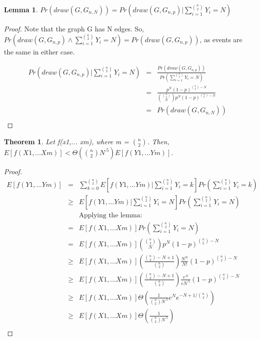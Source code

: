 \documentclass[10pt]{article}
\begin{document}
\newtheorem{lem}{Lemma}
\begin{lem}\label{Lemma}
$Pr(draw(G, G_{n,N})) = Pr(draw(G, G_{n,p})|\sum_{i=1}^{\binom{n}{2}}Y_{i}=N)$
\end{lem}

\begin{proof}

Note that the graph G has N edges. So, $Pr(draw(G, G_{n,p}) \wedge \sum_{i=1}^{\binom{n}{2}} Y_{i}=N) = Pr(draw(G, G_{n,p}))$, as events are the same in either case.

\begin{eqnarray}
Pr(draw(G, G_{n,p})|\sum_{i=1}^{\binom{n}{2}}Y_{i}=N) &=& \frac{Pr(draw(G, G_{n,p}))}{Pr(\sum_{i=1}^{\binom{n}{2}}Y_{i}=N)}\\
&=& \frac{p^{N} (1-p)^{\binom{n}{2}-N}}{\binom{\binom{n}{2}}{N} p^{N} (1-p)^{\binom{n}{2}-N}}\\
&=& Pr(draw(G, G_{n,N}))\\
\end{eqnarray} 
\end{proof}

\newtheorem{thm}{Theorem}
\begin{thm}\label{Theorem}
Let f(x1,... xm), where m = $\binom{n}{2}$. Then, $E[f(X1,... Xm)] < \Theta(\binom{n}{2}N^{.5}) E[f(Y1,... Ym)]$.
\end{thm}
\begin{proof}
\begin{eqnarray}
E[f(Y1,... Ym)] &=& \sum_{k=0}^{\binom{n}{2}}E[f(Y1,... Ym)|\sum_{i=1}^{\binom{n}{2}}Y_{i}=k]Pr(\sum_{i=1}^{\binom{n}{2}}Y_{i}=k) \\
&\geq& E[f(Y1,... Ym)|\sum_{i=1}^{\binom{n}{2}}Y_{i}=N]Pr(\sum_{i=1}^{\binom{n}{2}}Y_{i}=N)\\
&&\text{Applying the lemma:}\\
&=& E[f(X1,... Xm)]Pr(\sum_{i=1}^{\binom{n}{2}}Y_{i}=N)\\
&=& E[f(X1,... Xm)]\binom{\binom{n}{2}}{N} p^{N} (1-p)^{\binom{n}{2}-N}\\
&\geq& E[f(X1,... Xm)](\frac{\binom{n}{2}-N+1}{\binom{n}{2}}) \frac{N^{N}}{N!} (1-p)^{\binom{n}{2}-N}\\
&\geq& E[f(X1,... Xm)](\frac{\binom{n}{2}-N+1}{\binom{n}{2}}) \frac{e^{N}}{eN^{.5}} (1-p)^{\binom{n}{2}-N}\\
&\geq& E[f(X1,... Xm)]\Theta(\frac{1}{\binom{n}{2}N^{.5}}e^{N}e^{-N+1/\binom{n}{2}})\\
&\geq& E[f(X1,... Xm)]\Theta(\frac{1}{\binom{n}{2}N^{.5}})\\
\end{eqnarray} 
\end{proof}
\end{document}
